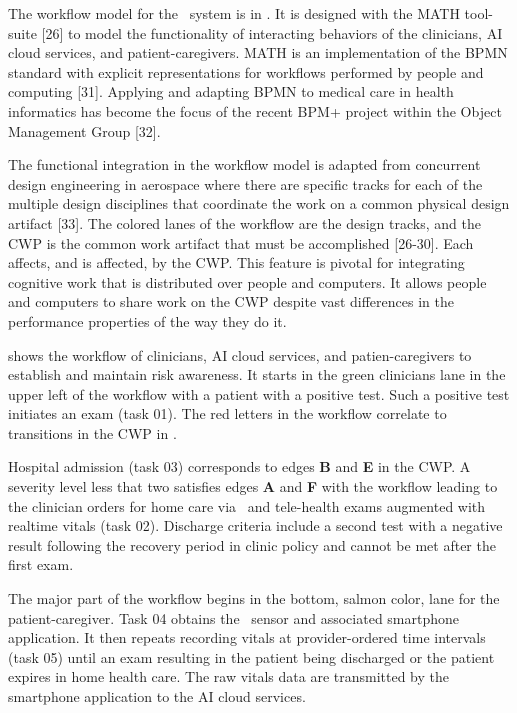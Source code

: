 The workflow model for the \phware\ system is in . It is designed with the MATH tool-suite [26] to model the functionality of interacting behaviors of the clinicians, AI cloud services, and patient-caregivers. MATH is an implementation of the BPMN standard with explicit representations for workflows performed by people and computing [31]. Applying and adapting BPMN to medical care in health informatics has become the focus of the recent BPM+ project within the Object Management Group [32]. 

The functional integration in the workflow model is adapted from concurrent design engineering in aerospace where there are specific tracks for each of the multiple design disciplines that coordinate the work on a common physical design artifact [33]. The colored lanes of the workflow are the design tracks, and the CWP is the common work artifact that must be accomplished [26-30]. Each affects, and is affected, by the CWP. This feature is pivotal for integrating cognitive work that is distributed over people and computers. It allows people and computers to share work on the CWP despite vast differences in the performance properties of the way they do it. 

 shows the workflow of clinicians, AI cloud services, and patien-caregivers to establish and maintain risk awareness. It starts in the green clinicians lane in the upper left of the workflow with a patient with a positive test. Such a positive test initiates an exam (task 01). The red letters in the workflow correlate to transitions in the CWP in . 

Hospital admission (task 03) corresponds to edges \textbf{B} and \textbf{E} in the CWP. A severity level less that two satisfies edges \textbf{A} and \textbf{F} with the workflow leading to the clinician orders for home care via \phware\ and tele-health exams augmented with realtime vitals (task 02). Discharge criteria include a second test with a negative result following the recovery period in clinic policy and cannot be met after the first exam.

The major part of the workflow begins in the bottom, salmon color, lane for the patient-caregiver. Task 04 obtains the \phware\ sensor and associated smartphone application. It then repeats recording vitals at provider-ordered time intervals (task 05) until an exam resulting in the patient being discharged or the patient expires in home health care. The raw vitals data are transmitted by the smartphone application to the AI cloud services. 

